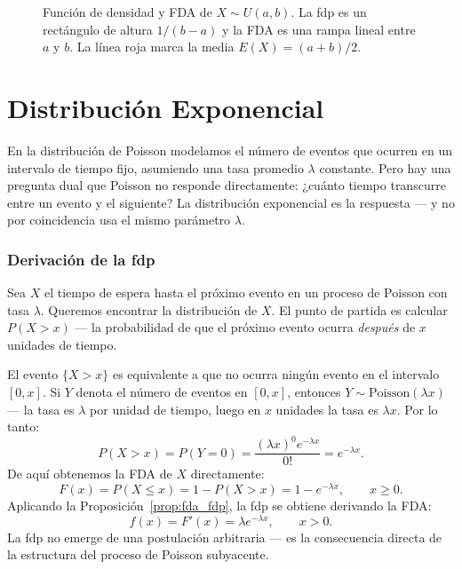 \documentclass[12pt, a4paper]{book}
\numberwithin{equation}{chapter}
\begin{document}
\begin{figure}[H]
	\caption{Función de densidad y FDA de $X \sim U(a,b)$. La fdp es
		un rectángulo de altura $1/(b-a)$ y la FDA es una rampa lineal
		entre $a$ y $b$. La línea roja marca la media $E(X) = (a+b)/2$.}
	\label{fig:uniforme_continua}
\end{figure}

\section{Distribuci\'{o}n Exponencial}

En la distribución de Poisson modelamos el número de eventos
que ocurren en un intervalo de tiempo fijo, asumiendo una tasa
promedio $\lambda$ constante. Pero hay una pregunta dual que
Poisson no responde directamente: ¿cuánto tiempo transcurre
entre un evento y el siguiente? La distribución exponencial
es la respuesta --- y no por coincidencia usa el mismo parámetro
$\lambda$.

\subsubsection{Derivaci\'{o}n de la fdp}

Sea $X$ el tiempo de espera hasta el próximo evento en un proceso
de Poisson con tasa $\lambda$. Queremos encontrar la distribución
de $X$. El punto de partida es calcular $P(X > x)$ --- la
probabilidad de que el próximo evento ocurra \emph{después} de
$x$ unidades de tiempo.

El evento $\{X > x\}$ es equivalente a que no ocurra ningún
evento en el intervalo $[0, x]$. Si $Y$ denota el número de
eventos en $[0,x]$, entonces $Y \sim \mathrm{Poisson}(\lambda x)$
--- la tasa es $\lambda$ por unidad de tiempo, luego en $x$
unidades la tasa es $\lambda x$. Por lo tanto:
\[
P(X > x) = P(Y = 0)
= \frac{(\lambda x)^0 e^{-\lambda x}}{0!}
= e^{-\lambda x}.
\]
De aquí obtenemos la FDA de $X$ directamente:
\[
F(x) = P(X \leq x) = 1 - P(X > x) = 1 - e^{-\lambda x},
\qquad x \geq 0.
\]
Aplicando la Proposición~\ref{prop:fda_fdp}, la fdp se obtiene
derivando la FDA:
\[
f(x) = F'(x) = \lambda e^{-\lambda x}, \qquad x > 0.
\]
La fdp no emerge de una postulación arbitraria --- es la
consecuencia directa de la estructura del proceso de Poisson
subyacente.
\end{document}

